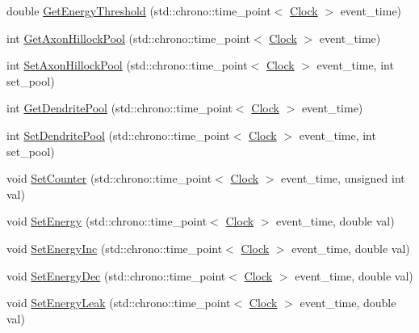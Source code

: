 \begin{DoxyCompactItemize}
\item 
double \hyperlink{class_soma_a0b45cc454565027bb25daa1396056a7e}{Get\+Energy\+Threshold} (std\+::chrono\+::time\+\_\+point$<$ \hyperlink{universe_8h_a0ef8d951d1ca5ab3cfaf7ab4c7a6fd80}{Clock} $>$ event\+\_\+time)
\item 
int \hyperlink{class_soma_a23dc309849522d9f857fdcc71ea85877}{Get\+Axon\+Hillock\+Pool} (std\+::chrono\+::time\+\_\+point$<$ \hyperlink{universe_8h_a0ef8d951d1ca5ab3cfaf7ab4c7a6fd80}{Clock} $>$ event\+\_\+time)
\item 
int \hyperlink{class_soma_a6ee53e0dd77fec097da1b81472d6f147}{Set\+Axon\+Hillock\+Pool} (std\+::chrono\+::time\+\_\+point$<$ \hyperlink{universe_8h_a0ef8d951d1ca5ab3cfaf7ab4c7a6fd80}{Clock} $>$ event\+\_\+time, int set\+\_\+pool)
\item 
int \hyperlink{class_soma_a000d9eca00c61af853fd81a2c1569b0e}{Get\+Dendrite\+Pool} (std\+::chrono\+::time\+\_\+point$<$ \hyperlink{universe_8h_a0ef8d951d1ca5ab3cfaf7ab4c7a6fd80}{Clock} $>$ event\+\_\+time)
\item 
int \hyperlink{class_soma_ac9fb87be6f9453cc4313e3a35c8b950c}{Set\+Dendrite\+Pool} (std\+::chrono\+::time\+\_\+point$<$ \hyperlink{universe_8h_a0ef8d951d1ca5ab3cfaf7ab4c7a6fd80}{Clock} $>$ event\+\_\+time, int set\+\_\+pool)
\item 
void \hyperlink{class_soma_a9ef49d3fea8c0fbe6513f3910339f736}{Set\+Counter} (std\+::chrono\+::time\+\_\+point$<$ \hyperlink{universe_8h_a0ef8d951d1ca5ab3cfaf7ab4c7a6fd80}{Clock} $>$ event\+\_\+time, unsigned int val)
\item 
void \hyperlink{class_soma_a0d1c0271fc8eeacd6e8836f751dff331}{Set\+Energy} (std\+::chrono\+::time\+\_\+point$<$ \hyperlink{universe_8h_a0ef8d951d1ca5ab3cfaf7ab4c7a6fd80}{Clock} $>$ event\+\_\+time, double val)
\item 
void \hyperlink{class_soma_a414afd7eb780e29a432603198a9838ed}{Set\+Energy\+Inc} (std\+::chrono\+::time\+\_\+point$<$ \hyperlink{universe_8h_a0ef8d951d1ca5ab3cfaf7ab4c7a6fd80}{Clock} $>$ event\+\_\+time, double val)
\item 
void \hyperlink{class_soma_a37081f7a8fc7832f8e89629221ddb8a6}{Set\+Energy\+Dec} (std\+::chrono\+::time\+\_\+point$<$ \hyperlink{universe_8h_a0ef8d951d1ca5ab3cfaf7ab4c7a6fd80}{Clock} $>$ event\+\_\+time, double val)
\item 
void \hyperlink{class_soma_abca59a00940ca2d9c005a84b6785c12f}{Set\+Energy\+Leak} (std\+::chrono\+::time\+\_\+point$<$ \hyperlink{universe_8h_a0ef8d951d1ca5ab3cfaf7ab4c7a6fd80}{Clock} $>$ event\+\_\+time, double val)

\end{DoxyCompactItemize}
